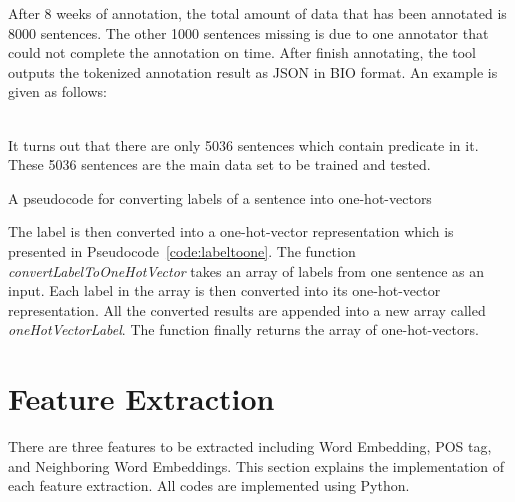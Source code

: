 After 8 weeks of annotation, the total amount of data that has been annotated is 8000 sentences. The other 1000 sentences missing is due to one annotator that could not complete the annotation on time. After finish annotating, the tool outputs the tokenized annotation result as JSON in BIO format. An example is given as follows:

\\

It turns out that there are only 5036 sentences which contain predicate in it. These 5036 sentences are the main data set to be trained and tested.

\begin{kode}
	
	
	\caption{A pseudocode for converting labels of a sentence into one-hot-vectors}
	\label{code:labeltoone}
\end{kode}

The label is then converted into a one-hot-vector representation which is presented in Pseudocode~\ref{code:labeltoone}. The function \textit{convertLabelToOneHotVector} takes an array of labels from one sentence as an input. Each label in the array is then converted into its one-hot-vector representation. All the converted results are appended into a new array called \textit{oneHotVectorLabel}. The function finally returns the array of one-hot-vectors.

\section{Feature Extraction}
There are three features to be extracted including Word Embedding, POS tag, and Neighboring Word Embeddings. This section explains the implementation of each feature extraction. All codes are implemented using Python.


